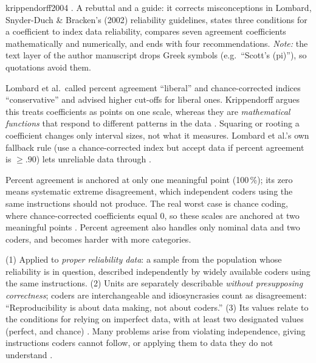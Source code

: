 \begin{papercard}{krippendorff2004}
 . A rebuttal and a guide: it corrects misconceptions in Lombard, Snyder-Duch \& Bracken's (2002) reliability guidelines, states three conditions for a coefficient to index data reliability, compares seven agreement coefficients mathematically and numerically, and ends with four recommendations. \emph{Note:} the text layer of the author manuscript drops Greek symbols (e.g.\ ``Scott's (pi)''), so quotations avoid them.

 Lombard et al.\ called percent agreement ``liberal'' and chance-corrected indices ``conservative'' and advised higher cut-offs for liberal ones. Krippendorff argues this treats coefficients as points on one scale, whereas they are \emph{mathematical functions} that respond to different patterns in the data . Squaring or rooting a coefficient changes only interval sizes, not what it measures. Lombard et al.'s own fallback rule (use a chance-corrected index but accept data if percent agreement is $\ge .90$) lets unreliable data through .

 Percent agreement is anchored at only one meaningful point (100\,\%); its zero means systematic extreme disagreement, which independent coders using the same instructions should not produce. The real worst case is chance coding, where chance-corrected coefficients equal 0, so these scales are anchored at two meaningful points . Percent agreement also handles only nominal data and two coders, and becomes harder with more categories.

 (1) Applied to \emph{proper reliability data}: a sample from the population whose reliability is in question, described independently by widely available coders using the same instructions. (2) Units are separately describable \emph{without presupposing correctness}; coders are interchangeable and idiosyncrasies count as disagreement: ``Reproducibility is about data making, not about coders.'' (3) Its values relate to the conditions for relying on imperfect data, with at least two designated values (perfect, and chance) . Many problems arise from violating independence, giving instructions coders cannot follow, or applying them to data they do not understand .


\end{papercard}
